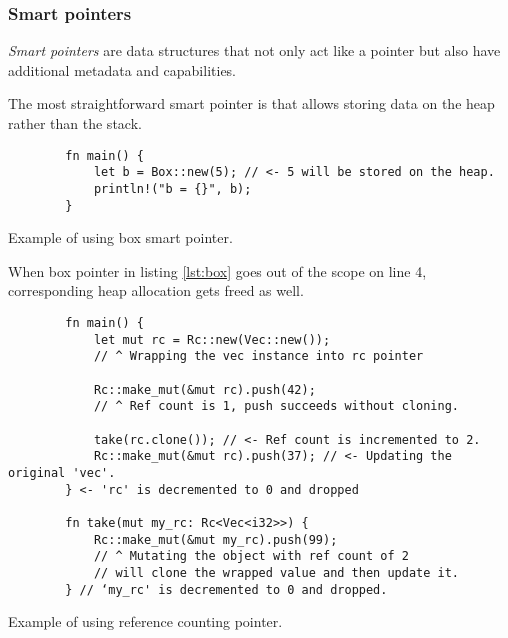 \subsubsection*{Smart pointers}
\emph{Smart pointers} are data structures that not only act like a pointer but also have additional metadata and capabilities.

The most straightforward smart pointer is  that allows storing data on the heap rather than the stack.

\begin{listing}[!htbp]

    \centering
    \begin{verbatim}
        fn main() {
            let b = Box::new(5); // <- 5 will be stored on the heap.
            println!("b = {}", b);
        }
    \end{verbatim}

    \caption{Example of using box smart pointer.}
    \label{lst:box}
\end{listing}

When box pointer in listing \ref{lst:box} goes out of the scope on line 4, corresponding heap allocation gets freed as well.

\begin{listing}[!htbp]

    \centering
    \begin{verbatim}
        fn main() {
            let mut rc = Rc::new(Vec::new());
            // ^ Wrapping the vec instance into rc pointer
        
            Rc::make_mut(&mut rc).push(42);
            // ^ Ref count is 1, push succeeds without cloning.
        
            take(rc.clone()); // <- Ref count is incremented to 2.
            Rc::make_mut(&mut rc).push(37); // <- Updating the original 'vec'.            
        } <- 'rc' is decremented to 0 and dropped
        
        fn take(mut my_rc: Rc<Vec<i32>>) {            
            Rc::make_mut(&mut my_rc).push(99); 
            // ^ Mutating the object with ref count of 2 
            // will clone the wrapped value and then update it.     
        } // ‘my_rc' is decremented to 0 and dropped.
    \end{verbatim}

    \caption{Example of using reference counting pointer.}
    \label{lst:rc}
\end{listing}

